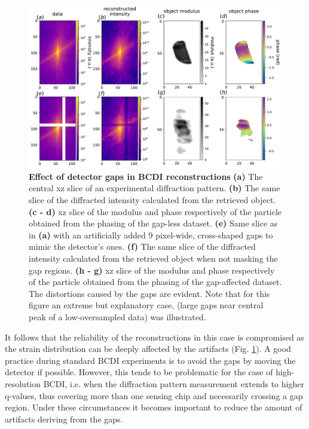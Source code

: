 \begin{figure}[h]
    \includegraphics[width=\textwidth]{figures/Inpainting/gaps_intropdf.pdf}
    \caption{\textbf{Effect of detector gaps in BCDI reconstructions} 
    \textbf{(a)} The central xz slice of an experimental diffraction pattern. \textbf{(b)} The same slice of the diffracted
    intensity calculated from the retrieved object. \textbf{(c - d)} xz slice of the modulus and phase respectively of the particle
    obtained from the phasing of the gap-less dataset. \textbf{(e)} Same slice as in \textbf{(a)} with an artificially added
    9 pixel-wide, cross-shaped gaps to mimic the detector's ones. \textbf{(f)} The same slice of the diffracted
    intensity calculated from the retrieved object when not masking the gap regions. \textbf{(h - g)} xz slice of the modulus and phase respectively of the particle
    obtained from the phasing of the gap-affected dataset. The distortions caused by the gaps are evident. Note that for 
    this figure an extreme but explanatory case, (large gaps near central peak of a low-oversampled data) was illustrated. }
    \label{fig:gap_intro}
    \end{figure}


It follows that the reliability of the reconstructions in this case is 
compromised as the strain distribution can be deeply affected by the artifacts (Fig. \ref{fig:gap_intro}). A good practice during standard BCDI experiments
is to avoid the gaps by moving the detector if possible. However, this tends to be problematic for the case of high-resolution BCDI, 
i.e. when the diffraction pattern measurement extends to higher q-values, thus covering more than one sensing 
chip and necessarily crossing a gap region. Under these circumstances it becomes important to reduce the amount of
artifacts deriving from the gaps. 


